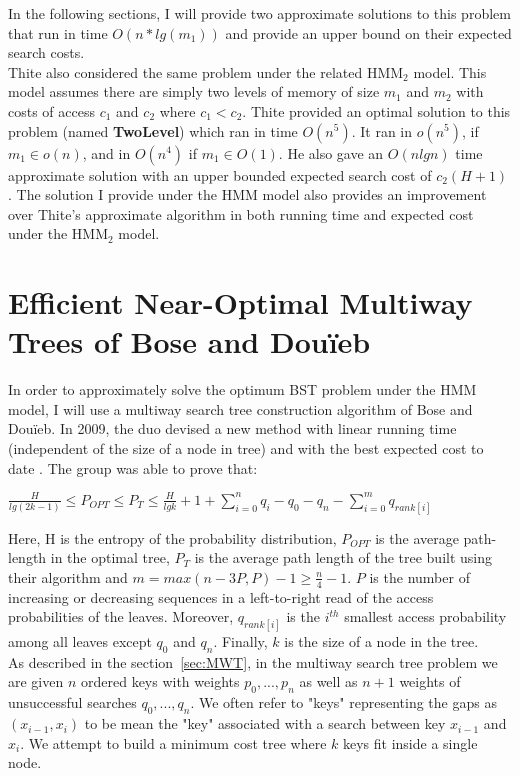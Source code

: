 \documentclass[letterpaper,12pt,titlepage,oneside,final]{book}
\theoremstyle{plain}
\begin{document}
 In the following sections, I will provide two approximate solutions to this problem that run in time $O(n*lg(m_1))$ and provide an upper bound on their expected search costs.  \\

Thite also considered the same problem under the related HMM$_2$ model. This model assumes there are simply two levels of memory of size $m_1$ and $m_2$ with costs of access $c_1$ and $c_2$ where $c_1 < c_2$. Thite provided an optimal solution to this problem (named \textbf{TwoLevel}) which ran in time $O(n^5)$. It ran in $o(n^5)$, if $m_1 \in o(n)$, and in $O(n^4)$ if $m_1 \in O(1)$. He also gave an $O(nlg n)$ time approximate solution with an upper bounded expected search cost of $c_2(H+1)$. The solution I provide under the HMM model also provides an improvement over Thite's approximate algorithm in both running time and expected cost under the HMM$_2$ model.


\section{Efficient Near-Optimal Multiway Trees of Bose and Dou\"{i}eb}\label{43}

In order to approximately solve the optimum BST problem under the HMM model, I will use a multiway search tree construction algorithm of Bose and Dou\"{i}eb. In 2009, the duo devised a new method with linear running time (independent of the size of a node in tree) and with the best expected cost to date \cite{bose2009efficient}. The group was able to prove that:
\begin{center}
$\frac{H}{lg(2k-1)} \leq P_{OPT} \leq P_T \leq \frac{H}{lg k} + 1 + \sum_{i=0}^n q_i - q_0 - q_n - \sum_{i=0}^m q_{rank[i]}$
\end{center}
Here, H is the entropy of the probability distribution, $P_{OPT}$ is the average path-length in the optimal tree, $P_T$ is the average path length of the tree built using their algorithm and $m=max({n-3P,P})-1 \geq \frac{n}{4} - 1$. $P$ is the number of increasing or decreasing sequences in a left-to-right read of the access probabilities of the leaves. Moreover, $q_{rank[i]}$ is the $i^{th}$ smallest access probability among all leaves except $q_0$ and $q_n$. Finally, $k$ is the size of a node in the tree. \\

As described in the section~\ref{sec:MWT}, in the multiway search tree problem we are given $n$ ordered keys with weights $p_0, ..., p_n$ as well as $n+1$ weights of unsuccessful searches $q_0,...,q_n$. We often refer to "keys" representing the gaps as $(x_{i-1},x_i)$ to be mean the "key" associated with a search between key $x_{i-1}$ and $x_i$. We attempt to build a minimum cost tree where $k$ keys fit inside a single node.\\
 
\end{document}
